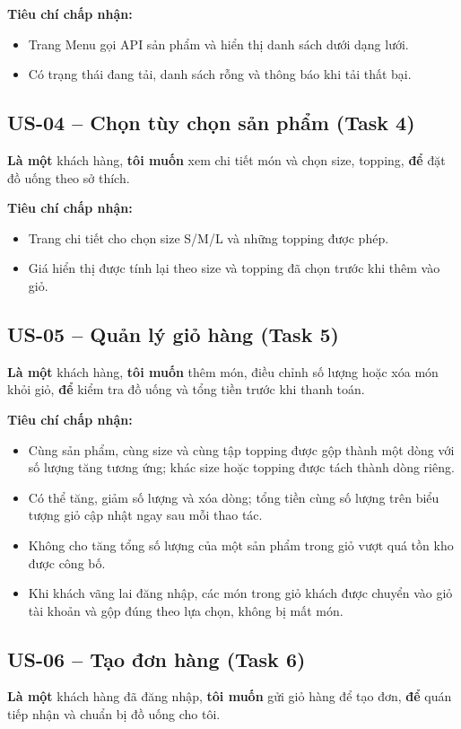 \textbf{Tiêu chí chấp nhận:}
\begin{itemize}
  \item Trang Menu gọi API sản phẩm và hiển thị danh sách dưới dạng lưới.
  \item Có trạng thái đang tải, danh sách rỗng và thông báo khi tải thất bại.
\end{itemize}

\subsection*{US-04 -- Chọn tùy chọn sản phẩm (Task 4)}
\textbf{Là một} khách hàng, \textbf{tôi muốn} xem chi tiết món và chọn size, topping, \textbf{để} đặt đồ uống theo sở thích.

\textbf{Tiêu chí chấp nhận:}
\begin{itemize}
  \item Trang chi tiết cho chọn size S/M/L và những topping được phép.
  \item Giá hiển thị được tính lại theo size và topping đã chọn trước khi thêm vào giỏ.
\end{itemize}

\subsection*{US-05 -- Quản lý giỏ hàng (Task 5)}
\textbf{Là một} khách hàng, \textbf{tôi muốn} thêm món, điều chỉnh số lượng hoặc xóa món khỏi giỏ, \textbf{để} kiểm tra đồ uống và tổng tiền trước khi thanh toán.

\textbf{Tiêu chí chấp nhận:}
\begin{itemize}
  \item Cùng sản phẩm, cùng size và cùng tập topping được gộp thành một dòng với số lượng tăng tương ứng; khác size hoặc topping được tách thành dòng riêng.
  \item Có thể tăng, giảm số lượng và xóa dòng; tổng tiền cùng số lượng trên biểu tượng giỏ cập nhật ngay sau mỗi thao tác.
  \item Không cho tăng tổng số lượng của một sản phẩm trong giỏ vượt quá tồn kho được công bố.
  \item Khi khách vãng lai đăng nhập, các món trong giỏ khách được chuyển vào giỏ tài khoản và gộp đúng theo lựa chọn, không bị mất món.
\end{itemize}

\subsection*{US-06 -- Tạo đơn hàng (Task 6)}
\textbf{Là một} khách hàng đã đăng nhập, \textbf{tôi muốn} gửi giỏ hàng để tạo đơn, \textbf{để} quán tiếp nhận và chuẩn bị đồ uống cho tôi.


